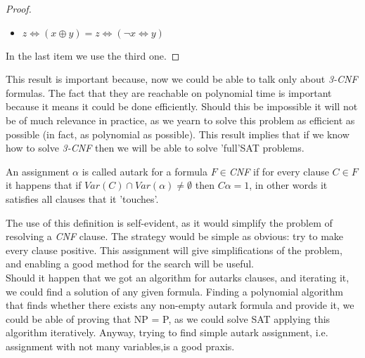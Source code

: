 \begin{proof}
\begin{itemize}
      \item $z \iff( x \oplus y ) =  z \iff(\neg  x \iff y )  $	

      \end{itemize}
      In the last item we use the third one.
      
    \end{proof}
    This result is important because, now we could be able to talk only about \emph{3-CNF} formulas. The fact that they are reachable on polynomial time is important because it means it could be done efficiently. Should this be impossible it will not be of much relevance in practice, as we yearn to solve this problem as efficient as possible (in fact, as polynomial as possible). This result implies that if we know how to solve \emph{3-CNF} then we will be able to solve 'full'SAT problems.
    \begin{definition}
      An assignment $\alpha$ is called autark for a formula $F\in$\emph{CNF} if for every clause $C \in F$ it happens that if $Var(C) \cap Var(\alpha) \ne \emptyset $ then $C\alpha = 1$, in other words it satisfies all clauses that it 'touches'. 
    \end{definition}

    The use of this definition is self-evident, as it would simplify the problem of resolving a \emph{CNF} clause. The strategy would be simple as obvious: try to make every clause positive. This assignment will give simplifications of the problem, and enabling a good method for the search will be useful.\\ 

    Should it happen that we got an algorithm for autarks clauses, and iterating it, we could find a solution of any given formula. Finding a polynomial algorithm that finds whether there exists any non-empty autark formula and provide it, we could be able of proving that NP = P, as we could solve SAT applying this algorithm iteratively. Anyway, trying to find simple autark assignment, i.e. assignment with not many variables,is a good praxis.

